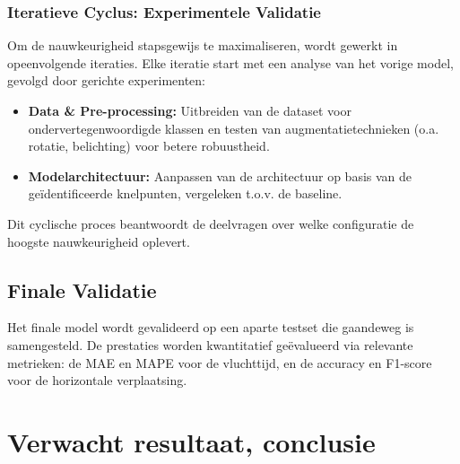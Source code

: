 \subsubsection{Iteratieve Cyclus: Experimentele Validatie}
Om de nauwkeurigheid stapsgewijs te maximaliseren, wordt gewerkt in opeenvolgende iteraties. Elke iteratie start met een analyse van het vorige model, gevolgd door gerichte experimenten:
\begin{itemize}
    \item \textbf{Data \& Pre-processing:} Uitbreiden van de dataset voor ondervertegenwoordigde klassen en testen van augmentatietechnieken (o.a. rotatie, belichting) voor betere robuustheid.
    \item \textbf{Modelarchitectuur:} Aanpassen van de architectuur op basis van de geïdentificeerde knelpunten, vergeleken t.o.v. de baseline.
\end{itemize}
Dit cyclische proces beantwoordt de deelvragen over welke configuratie de hoogste nauwkeurigheid oplevert.

\subsection{Finale Validatie}
\label{sec:validatie}
Het finale model wordt gevalideerd op een aparte testset die gaandeweg is samengesteld. De prestaties worden kwantitatief ge{\"e}valueerd via relevante metrieken: de MAE en MAPE voor de vluchttijd, en de accuracy en F1-score voor de horizontale verplaatsing.

%
%
%

\section{Verwacht resultaat, conclusie}
\label{sec:verwacht_resultaat_conclusie}

